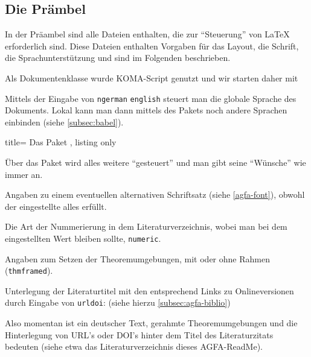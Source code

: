 \subsection{Die Prämbel}\label{subsec:preamble}
%
In der Präambel sind alle Dateien enthalten, die zur \enquote{Steuerung} von \LaTeX{} erforderlich sind.
Diese Dateien enthalten Vorgaben für das Layout, die Schrift, die Sprachunterstützung \etc und sind im Folgenden beschrieben.

Als Dokumentenklasse wurde KOMA-Script genutzt und wir starten daher mit
%
%
Mittels der Eingabe von \texttt{ngerman} \bzw \texttt{english} steuert man die globale Sprache des Dokuments. 
Lokal kann man dann mittels des Pakets  noch andere Sprachen einbinden (siehe \vref{subsec:babel}).
\begin{tcblisting}{title= Das Paket , listing only}
\usepackage[%
	,thmframed			%
	,numeric				%
	,urldoi				%
	,lmodern				%
	]{./preamble/agfa-art} 
\end{tcblisting}
Über das Paket  wird alles weitere \enquote{gesteuert} und man gibt seine \enquote{Wünsche} wie immer an.


\begin{myitemize}

\item
Angaben zu einem eventuellen alternativen Schriftsatz (siehe \cref{agfa-font}), obwohl der eingestellte alles erfüllt.

\item
Die Art der Nummerierung in dem Literaturverzeichnis, wobei man bei dem eingestellten Wert bleiben sollte, \texttt{numeric}.

\item
Angaben zum Setzen der Theoremumgebungen, \dh mit oder ohne Rahmen (\texttt{thmframed}).

\item
Unterlegung der Literaturtitel mit den entsprechend Links zu Onlineversionen durch Eingabe von \texttt{urldoi}: (siehe hierzu \vref{subsec:agfa-biblio})
\end{myitemize}
%
Also momentan ist ein deutscher Text, gerahmte Theoremumgebungen und die Hinterlegung von URL's oder DOI's hinter dem Titel des Literaturzitats bedeuten (siehe etwa das Literaturverzeichnis dieses AGFA-ReadMe).

